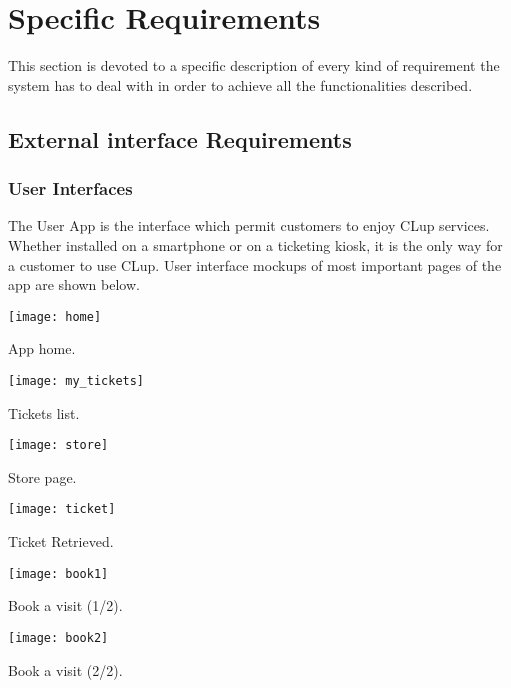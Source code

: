 \chapter{Specific Requirements}
This section is devoted to a specific description of every kind of requirement the
system has to deal with in order to achieve all the functionalities described.
\section{External interface Requirements}
\subsection{User Interfaces}
The User App is the interface which permit customers to enjoy CLup services. Whether installed on a smartphone or on a ticketing kiosk, it is the only way for a customer to use CLup.
User interface mockups of most important pages of the app are shown below.

\vspace{0.5cm}
\begin{minipage}{.5\textwidth}
	\centering
	\texttt{[image: home]}
	\captionsetup{type=figure}
	\caption{App home.}
\end{minipage}%
\begin{minipage}{.5\textwidth}
	\centering
	\texttt{[image: my\_tickets]}
	\captionsetup{type=figure}
	\caption{Tickets list.}
\end{minipage}

\clearpage

\begin{minipage}{.5\textwidth}
	\centering
	\texttt{[image: store]}
	\captionsetup{type=figure}
	\caption{Store page.}
\end{minipage}%
\begin{minipage}{.5\textwidth}
	\centering
	\texttt{[image: ticket]}
	\captionsetup{type=figure}
	\caption{Ticket Retrieved.}
\end{minipage}

\vspace{1cm}

\begin{minipage}{.5\textwidth}
	\centering
	\texttt{[image: book1]}
	\captionsetup{type=figure}
	\caption{Book a visit (1/2).}
\end{minipage}%
\begin{minipage}{.5\textwidth}
	\centering
	\texttt{[image: book2]}
	\captionsetup{type=figure}
	\caption{Book a visit (2/2).}
\end{minipage}

